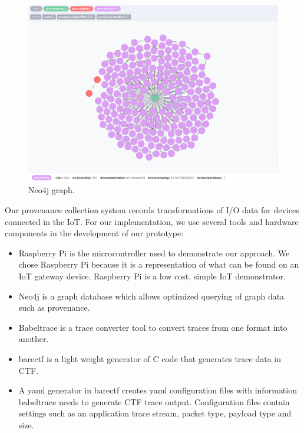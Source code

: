 \begin{figure}[h!]
\begin{center}

\includegraphics[width=\textwidth]{neo4j.png}    
\end{center}
\caption{Neo4j graph.}
\label{architecture}
\end{figure}

Our provenance collection system records transformations of I/O data for devices connected in the IoT. For our implementation, we use several tools and hardware components in the development of our prototype:

\begin{itemize}
\item Raspberry Pi is the microcontroller used to demonstrate our approach. We chose Raspberry Pi because it is a representation of what can be found on an IoT gateway device. Raspberry Pi is a low cost, simple IoT demonstrator.


\item Neo4j is a graph database which allows optimized querying of graph data such as provenance.


\item Babeltrace is a trace converter tool to convert traces from one format into another. 

\item barectf is a light weight generator of C code  that generates trace data in CTF. 

\item  A yaml generator in barectf creates yaml  configuration files with information babeltrace needs to generate CTF trace output. Configuration  files contain settings such as an application trace stream, packet type, payload type and size. 


\end{itemize}

